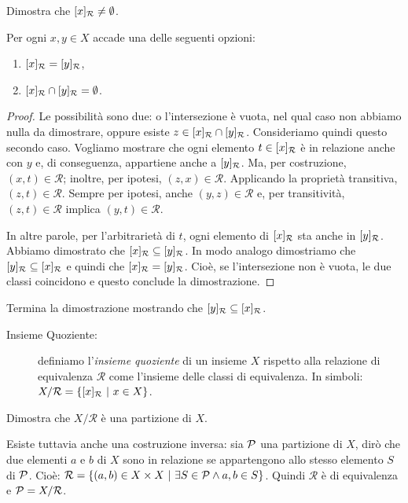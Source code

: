 		\begin{es}
			Dimostra che $[x]_{\mathcal{R}}\neq\emptyset$.
		\end{es}
		\begin{prop}
			Per ogni $x,y\in X$ accade una delle seguenti opzioni:
			\begin{enumerate}
				\item $[x]_{\mathcal{R}}=[y]_{\mathcal{R}}$,
				\item $[x]_{\mathcal{R}}\cap[y]_{\mathcal{R}}=\emptyset$.
			\end{enumerate}
		\end{prop}
		\begin{proof}
			Le possibilità sono due: o l'intersezione è vuota, nel qual caso non abbiamo nulla da dimostrare, oppure esiste $z\in[x]_{\mathcal{R}}\cap[y]_{\mathcal{R}}$. Consideriamo quindi questo secondo caso. Vogliamo mostrare che ogni elemento $t\in[x]_{\mathcal{R}}$ è in relazione anche con $y$ e, di conseguenza, appartiene anche a $[y]_{\mathcal{R}}$. Ma, per costruzione, $(x,t)\in\mathcal{R}$; inoltre, per ipotesi, $(z,x)\in\mathcal{R}$. Applicando la proprietà transitiva, $(z,t)\in\mathcal{R}$.
			Sempre per ipotesi, anche $(y,z)\in\mathcal{R}$ e, per transitività, $(z,t)\in\mathcal{R}$ implica $(y,t)\in\mathcal{R}$. 
			
			In altre parole, per l'arbitrarietà di $t$, ogni elemento di $[x]_{\mathcal{R}}$ sta anche in $[y]_{\mathcal{R}}$. Abbiamo dimostrato che $[x]_{\mathcal{R}}\subseteq[y]_{\mathcal{R}}$. In modo analogo dimostriamo che $[y]_{\mathcal{R}}\subseteq[x]_{\mathcal{R}}$ e quindi che $[x]_{\mathcal{R}}=[y]_{\mathcal{R}}$. Cioè, se l'intersezione non è vuota, le due classi coincidono e questo conclude la dimostrazione.
		\end{proof}
		\begin{es}
			Termina la dimostrazione mostrando che $[y]_{\mathcal{R}}\subseteq[x]_{\mathcal{R}}$.
		\end{es}
		\begin{description}
			\item[Insieme Quoziente:] definiamo l'\emph{insieme quoziente} di un insieme $X$ rispetto alla relazione di equivalenza $\mathcal{R}$ come l'insieme delle classi di equivalenza. In simboli: $X/\mathcal{R}=\{[x]_{\mathcal{R}}\ \rvert\  x\in X\}$.
		\end{description}
		\begin{es}
			Dimostra che $X/\mathcal{R}$ è una partizione di $X$.
		\end{es}
		Esiste tuttavia anche una costruzione inversa: sia $\mathcal{P}$ una partizione di $X$, dirò che due elementi $a$ e $b$ di $X$ sono in relazione se appartengono allo stesso elemento $S$ di $\mathcal{P}$. Cioè: $\mathcal{R}=\{(a,b)\in X\times X\ \rvert\  \exists S\in\mathcal{P} \land a,b\in S\}$. Quindi $\mathcal{R}$ è di equivalenza e $\mathcal{P}=X/\mathcal{R}$.
